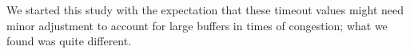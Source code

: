 We started this study with the expectation that these
timeout values might need minor adjustment to account for
large buffers in times of congestion; what we found was
quite different.







